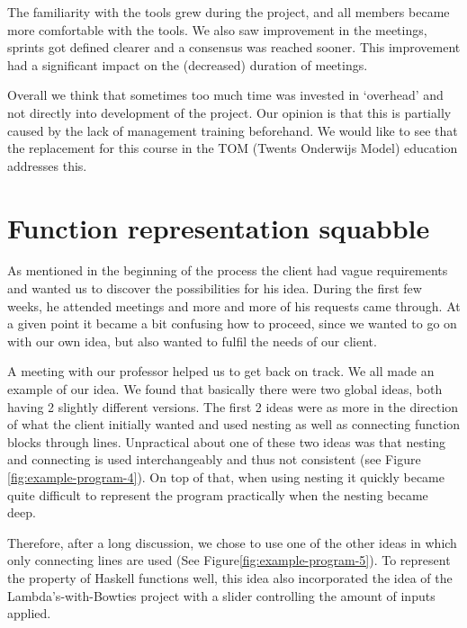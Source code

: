 The familiarity with the tools grew during the project, and all members became more comfortable with the tools. We also saw improvement in the meetings, sprints got defined clearer and a consensus was reached sooner. This improvement had a significant impact on the (decreased) duration of meetings.

Overall we think that sometimes too much time was invested in `overhead' and not directly into development of the project. Our opinion is that this is partially caused by the lack of management training beforehand. We would like to see that the replacement for this course in the TOM (Twents Onderwijs Model) education addresses this.

\section{Function representation squabble}

As mentioned in the beginning of the process the client had vague requirements and wanted us to discover the possibilities for his idea.
During the first few weeks, he attended meetings and more and more of his requests came through.  At a given point it became a bit confusing how to proceed, since we wanted to go on with our own idea, but also wanted to fulfil the needs of our client.

A meeting with our professor helped us to get back on track. We all made an example of our idea. We found that basically there were two global ideas, both having 2 slightly different versions. The first 2 ideas were as more in the direction of what the client initially wanted and used nesting as well as connecting function blocks through lines. Unpractical about one of these two ideas was that nesting and connecting is used interchangeably and thus not consistent (see Figure \ref{fig:example-program-4}). On top of that, when using nesting it quickly became quite difficult to represent the program practically when the nesting became deep.

Therefore, after a long discussion, we chose to use one of the other ideas in which only connecting lines are used (See Figure\ref{fig:example-program-5}). To represent the property of Haskell functions well, this idea also incorporated the idea of the Lambda's-with-Bowties project with a slider controlling the amount of inputs applied.

